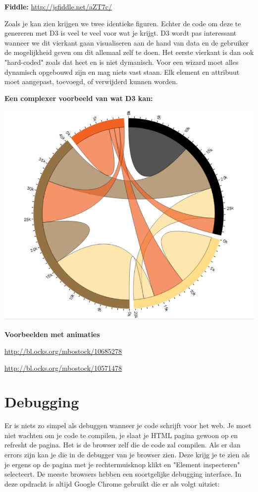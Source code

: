 \textbf{Fiddle: }\url{http://jsfiddle.net/aZT7c/}

Zoals je kan zien krijgen we twee identieke figuren. Echter de code om deze te genereren met D3 is veel te veel voor wat je krijgt. D3 wordt pas interessant wanneer we dit vierkant gaan visualiseren aan de hand van data en de gebruiker de mogelijkheid geven om dit allemaal zelf te doen. Het eerste vierkant is dan ook "hard-coded" zoals dat heet en is niet dymanisch. Voor een wizard moet alles dynamisch opgebouwd zijn en mag niets vast staan. Elk element en attribuut moet aangepast, toevoegd, of verwijderd kunnen worden.

\textbf{Een complexer voorbeeld van wat D3 kan:}
\begin{center}
  \includegraphics[]{figures/chap2/chorddiagram.png}
\end{center}
\textbf{Voorbeelden met animaties}

\url{http://bl.ocks.org/mbostock/10685278}

\url{http://bl.ocks.org/mbostock/10571478}



\section{Debugging}
Er is niets zo simpel als debuggen wanneer je code schrijft voor het web. Je moet niet wachten om je code te compilen, je slaat je HTML pagina gewoon op en refresht de pagina. Het is de browser zelf die de code zal compilen. Als er dan errors zijn kan je die in de debugger van je browser zien. Deze krijg je te zien als je ergens op de pagina met je rechtermuisknop klikt en "Element inspecteren" selecteert. De meeste browsers hebben een soortgelijke debugging interface. In deze opdracht is altijd Google Chrome gebruikt die er als volgt uitziet:


